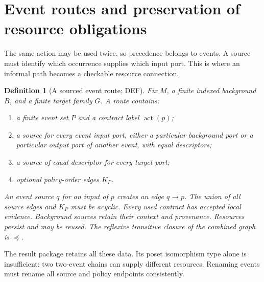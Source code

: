 \documentclass[11pt,a4paper]{article}
\newtheorem{definition}{Definition}[section]
\theoremstyle{remark}
\newcommand{\status}[1]{\textsf{\small #1}}
\begin{document}
\section{Event routes and preservation of resource obligations}
\label{sec:routes}
The same action may be used twice, so precedence belongs to events.
A source must identify which occurrence supplies which input port.
This is where an informal path becomes a checkable resource connection.

\begin{definition}[A sourced event route; \status{DEF}]\label{def:route}
Fix \(M\), a finite indexed background \(B\), and a finite target family \(G\).
A route contains:
\begin{enumerate}
\item a finite event set \(P\) and a contract label \(\operatorname{act}(p)\);
\item a source for every event input port, either a particular background port
or a particular output port of another event, with equal descriptors;
\item a source of equal descriptor for every target port;
\item optional policy-order edges \(K_P\).
\end{enumerate}
An event source \(q\) for an input of \(p\) creates an edge \(q\to p\).
The union of all source edges and \(K_P\) must be acyclic.
Every used contract has accepted local evidence. Background sources retain
their context and provenance. Resources persist and may be reused.
The reflexive transitive closure of the combined graph is \(\preceq\).
\end{definition}
The result package retains all these data. Its poset isomorphism type alone
is insufficient: two two-event chains can supply different resources.
Renaming events must rename all source and policy endpoints consistently.
\end{document}
